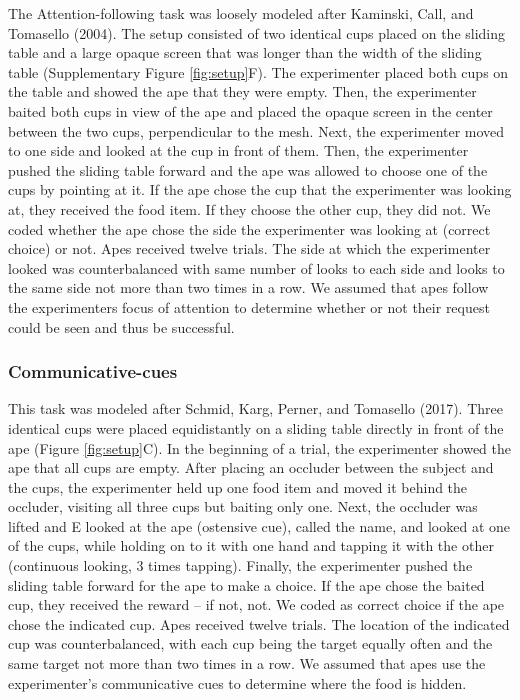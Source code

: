 \documentclass[
  man,floatsintext]{apa6}
\begin{document}
The Attention-following task was loosely modeled after Kaminski, Call, and Tomasello (2004). The setup consisted of two identical cups placed on the sliding table and a large opaque screen that was longer than the width of the sliding table (Supplementary Figure \ref{fig:setup}F). The experimenter placed both cups on the table and showed the ape that they were empty. Then, the experimenter baited both cups in view of the ape and placed the opaque screen in the center between the two cups, perpendicular to the mesh. Next, the experimenter moved to one side and looked at the cup in front of them. Then, the experimenter pushed the sliding table forward and the ape was allowed to choose one of the cups by pointing at it. If the ape chose the cup that the experimenter was looking at, they received the food item. If they choose the other cup, they did not. We coded whether the ape chose the side the experimenter was looking at (correct choice) or not. Apes received twelve trials. The side at which the experimenter looked was counterbalanced with same number of looks to each side and looks to the same side not more than two times in a row. We assumed that apes follow the experimenters focus of attention to determine whether or not their request could be seen and thus be successful.

\hypertarget{communicative-cues}{%
\subsubsection{Communicative-cues}\label{communicative-cues}}

This task was modeled after Schmid, Karg, Perner, and Tomasello (2017). Three identical cups were placed equidistantly on a sliding table directly in front of the ape (Figure \ref{fig:setup}C). In the beginning of a trial, the experimenter showed the ape that all cups are empty. After placing an occluder between the subject and the cups, the experimenter held up one food item and moved it behind the occluder, visiting all three cups but baiting only one. Next, the occluder was lifted and E looked at the ape (ostensive cue), called the name, and looked at one of the cups, while holding on to it with one hand and tapping it with the other (continuous looking, 3 times tapping). Finally, the experimenter pushed the sliding table forward for the ape to make a choice. If the ape chose the baited cup, they received the reward -- if not, not. We coded as correct choice if the ape chose the indicated cup. Apes received twelve trials. The location of the indicated cup was counterbalanced, with each cup being the target equally often and the same target not more than two times in a row. We assumed that apes use the experimenter's communicative cues to determine where the food is hidden.
\end{document}
